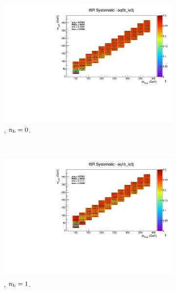 \begin{figure}[ht!]
\begin{subfigure}[b]{0.32\textwidth}
  \end{subfigure}
  \begin{subfigure}[b]{0.32\textwidth}
    \includegraphics[width=\textwidth, page=1]{Figs/sms/t2degen/v19/systs/T2_4body_ISR_eq0b_le3j.pdf}
    \caption{\njlow, $n_{\text{b}} = 0$.}
  \end{subfigure}\\
  \begin{subfigure}[b]{0.32\textwidth}
    \includegraphics[width=\textwidth, page=12]{Figs/sms/t2degen/v19/systs/T2_4body_ISR_eq1b_le3j.pdf}
    \caption{\njlow, $n_{\text{b}} = 1$.}
  \end{subfigure}
  \begin{subfigure}[b]{0.32\textwidth}

\end{subfigure}
\end{figure}
